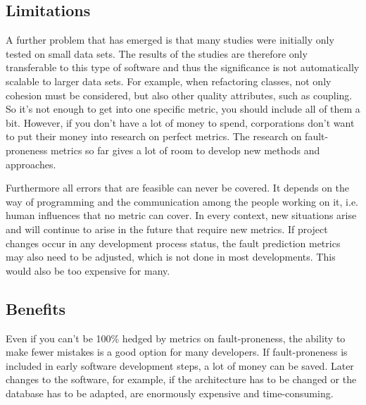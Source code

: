 \subsection{Limitations}

A further problem that has emerged is that many studies were initially only tested on small data sets. The results of the studies are therefore only transferable to this type of software and thus the significance is not automatically scalable to larger data sets. For example, when refactoring classes, not only cohesion must be considered, but also other quality attributes, such as coupling. So it's not enough to get into one specific metric, you should include all of them a bit. However, if you don't have a lot of money to spend, corporations don't want to put their money into research on perfect metrics. The research on fault-proneness metrics so far gives a lot of room to develop new methods and approaches.

Furthermore all errors that are feasible can never be covered. It depends on the way of programming and the communication among the people working on it, i.e. human influences that no metric can cover. In every context, new situations arise and will continue to arise in the future that require new metrics. If project changes occur in any development process status, the fault prediction metrics may also need to be adjusted, which is not done in most developments. This would also be too expensive for many.

\subsection{Benefits}

Even if you can't be 100\% hedged by metrics on fault-proneness, the ability to make fewer mistakes is a good option for many developers. If fault-proneness is included in early software development steps, a lot of money can be saved.
Later changes to the software, for example, if the architecture has to be changed or the database has to be adapted, are enormously expensive and time-consuming.
